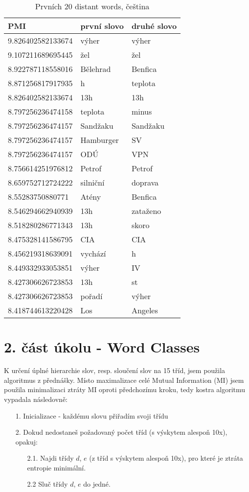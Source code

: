 \documentclass[12pt, a4paper]{report}
\theoremstyle{remark}
\begin{document}
\begin{table}[h!]
\begin{tabular}{lll}
         PMI & první slovo & druhé slovo \\
\toprule
9.826402582133674 & výher & výher \\
9.107211689695445 & žel & žel \\
8.922787118558016 & Bělehrad & Benfica \\
8.871256817917935 & h & teplota \\
8.826402582133674 & 13h & 13h \\
8.797256236474158 & teplota & minus \\
8.797256236474157 & Sandžaku & Sandžaku \\
8.797256236474157 & Hamburger & SV \\
8.797256236474157 & ODÚ & VPN \\
8.756614251976812 & Petrof & Petrof \\
8.659752712724222 & silniční & doprava \\
8.55283750880771 & Atény & Benfica \\
8.546294662940939 & 13h & zataženo \\
8.518280286771343 & 13h & skoro \\
8.475328141586795 & CIA & CIA \\
8.456219318639091 & vychází & h \\
8.449332933053851 & výher & IV \\
8.427306626723853 & 13h & st \\
8.427306626723853 & pořadí & výher \\
8.418744613220428 & Los & Angeles \\
\end{tabular}
\caption{Prvních 20 distant words, čeština}
\end{table}
\newpage
\section*{2. část úkolu - Word Classes}

K určení úplné hierarchie slov, resp. sloučení slov na 15 tříd, jsem použila algoritmus z přednášky. Místo maximalizace celé Mutual Information (MI) jsem použila minimalizaci ztráty MI oproti předchozímu kroku, tedy kostra algoritmu vypadala následovně: 

\begin{itemize}
\item[1.] Inicializace - každému slovu přiřadím svoji třídu
\item[2.] Dokud nedostaneš požadovaný počet tříd (s výskytem alespoň 10x), opakuj:

        \begin{itemize}
        \item[2.1.] Najdi třídy $d$, $e$ (z tříd s výskytem alespoň 10x), pro které je ztráta entropie minimální.
        \item[2.2] Sluč třídy $d$, $e$ do jedné.
        \end{itemize}
\end{itemize}
\end{document}
